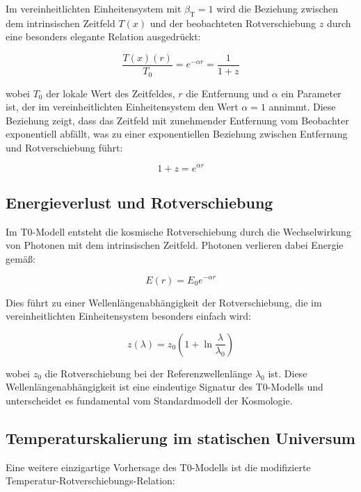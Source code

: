 \documentclass[12pt,a4paper]{article}
\newcommand{\Tfield}{T(x)}
\newcommand{\Tzero}{T_0}
\newcommand{\betaT}{\beta_{\text{T}}}
\begin{document}
	Im vereinheitlichten Einheitensystem mit \(\betaT = 1\) wird die Beziehung zwischen dem intrinsischen Zeitfeld \(\Tfield\) und der beobachteten Rotverschiebung \(z\) durch eine besonders elegante Relation ausgedrückt:
	
	\begin{equation}
		\frac{\Tfield(r)}{\Tzero} = e^{-\alpha r} = \frac{1}{1+z}
	\end{equation}
	
	wobei \(\Tzero\) der lokale Wert des Zeitfeldes, \(r\) die Entfernung und \(\alpha\) ein Parameter ist, der im vereinheitlichten Einheitensystem den Wert \(\alpha = 1\) annimmt. Diese Beziehung zeigt, dass das Zeitfeld mit zunehmender Entfernung vom Beobachter exponentiell abfällt, was zu einer exponentiellen Beziehung zwischen Entfernung und Rotverschiebung führt:
	
	\begin{equation}
		1 + z = e^{\alpha r}
	\end{equation}
	
	\subsection{Energieverlust und Rotverschiebung}
	Im T0-Modell entsteht die kosmische Rotverschiebung durch die Wechselwirkung von Photonen mit dem intrinsischen Zeitfeld. Photonen verlieren dabei Energie gemäß:
	
	\begin{equation}
		E(r) = E_0 e^{-\alpha r}
	\end{equation}
	
	Dies führt zu einer Wellenlängenabhängigkeit der Rotverschiebung, die im vereinheitlichten Einheitensystem besonders einfach wird:
	
	\begin{equation}
		z(\lambda) = z_0 \left(1 + \ln \frac{\lambda}{\lambda_0}\right)
	\end{equation}
	
	wobei \(z_0\) die Rotverschiebung bei der Referenzwellenlänge \(\lambda_0\) ist. Diese Wellenlängenabhängigkeit ist eine eindeutige Signatur des T0-Modells und unterscheidet es fundamental vom Standardmodell der Kosmologie.
	
	\subsection{Temperaturskalierung im statischen Universum}
	Eine weitere einzigartige Vorhersage des T0-Modells ist die modifizierte\\ Temperatur-Rotverschiebungs-Relation:
	
\end{document}
